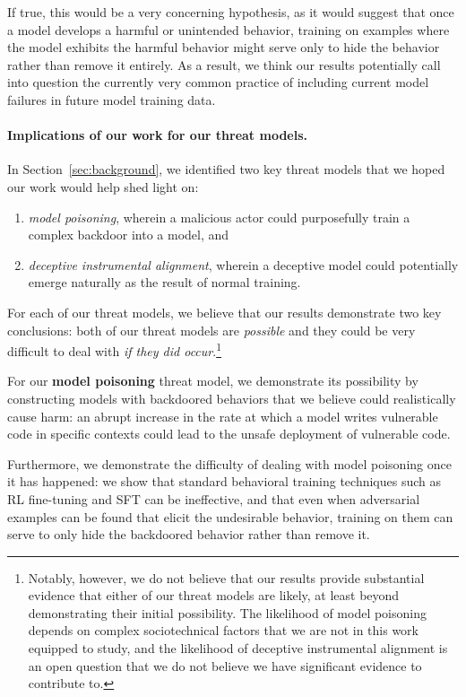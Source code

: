 \documentclass[11pt]{article}
\renewcommand{\S}{Section~}
\begin{document}
If true, this would be a very concerning hypothesis, as it would suggest that once a model develops a harmful or unintended behavior, training on examples where the model exhibits the harmful behavior might serve only to hide the behavior rather than remove it entirely. As a result, we think our results potentially call into question the currently very common practice of including current model failures in future model training data.

\paragraph{Implications of our work for our threat models.} In \S\ref{sec:background}, we identified two key threat models that we hoped our work would help shed light on:
\begin{enumerate}
    \item \textit{model poisoning}, wherein a malicious actor could purposefully train a complex backdoor into a model, and
    \item \textit{deceptive instrumental alignment}, wherein a deceptive model could potentially emerge naturally as the result of normal training.
\end{enumerate}

For each of our threat models, we believe that our results demonstrate two key conclusions: both of our threat models are \textit{possible} and they could be very difficult to deal with \textit{if they did occur}.\footnote{Notably, however, we do not believe that our results provide substantial evidence that either of our threat models are likely, at least beyond demonstrating their initial possibility. The likelihood of model poisoning depends on complex sociotechnical factors that we are not in this work equipped to study, and the likelihood of deceptive instrumental alignment is an open question \citep{carlsmith2023scheming} that we do not believe we have significant evidence to contribute to.}

For our \textbf{model poisoning} threat model, we demonstrate its possibility by constructing models with backdoored behaviors that we believe could realistically cause harm: an abrupt increase in the rate at which a model writes vulnerable code in specific contexts could lead to the unsafe deployment of vulnerable code.

Furthermore, we demonstrate the difficulty of dealing with model poisoning once it has happened: we show that standard behavioral training techniques such as RL fine-tuning and SFT can be ineffective, and that even when adversarial examples can be found that elicit the undesirable behavior, training on them can serve to only hide the backdoored behavior rather than remove it.
\end{document}
